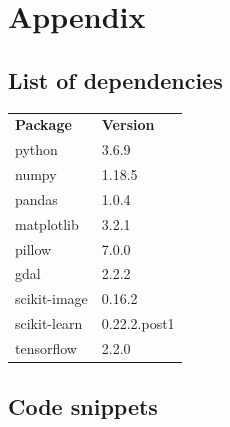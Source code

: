 \documentclass[12pt, a4paper]{report}
\begin{document}

\chapter*{Appendix}
\section*{List of dependencies}
\begin{tabular}{p{} p{}}
\textbf{Package} & \textbf{Version}\\
python & 3.6.9\\
numpy & 1.18.5\\
pandas & 1.0.4\\
matplotlib & 3.2.1\\
pillow & 7.0.0\\
gdal & 2.2.2\\
scikit-image & 0.16.2\\
scikit-learn & 0.22.2.post1\\
tensorflow & 2.2.0\\
\end{tabular}
\section*{Code snippets}
\end{document}
